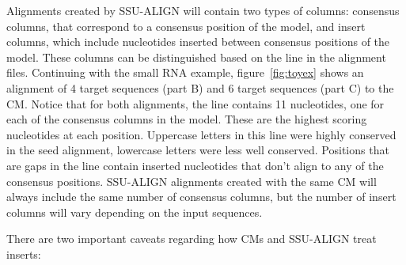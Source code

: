 Alignments created by SSU-ALIGN will contain two types of
columns: consensus columns, that correspond to a consensus position of
the model, and insert columns, which include nucleotides inserted
between consensus positions of the model. These columns can be
distinguished based on the  line in the alignment
files. Continuing with the small RNA example, figure~\ref{fig:toyex}
shows an alignment of 4 target sequences (part B) and 6 target
sequences (part C) to the CM. Notice that for both alignments, the
 line contains 11 nucleotides, one for each of the
consensus columns in the model. These are the highest scoring
nucleotides at each position. Uppercase letters in this line were
highly conserved in the seed alignment, lowercase letters were less
well conserved. Positions that are gaps in the  line
contain inserted nucleotides that don't align to any of the consensus
positions. 
SSU-ALIGN alignments created with the same CM will
always include the same number of consensus columns, but the number of
insert columns will vary depending on the input sequences.

There are two important caveats regarding how CMs and SSU-ALIGN
treat inserts:

